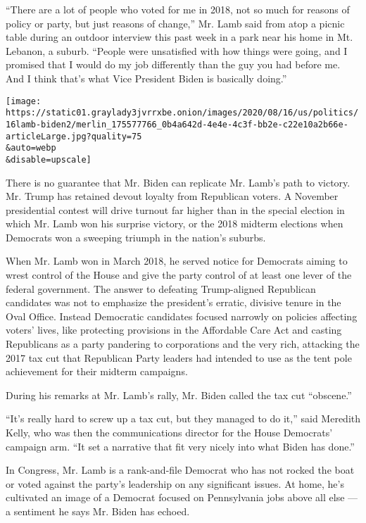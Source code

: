 ``There are a lot of people who voted for me in 2018, not so much for
reasons of policy or party, but just reasons of change,'' Mr. Lamb said
from atop a picnic table during an outdoor interview this past week in a
park near his home in Mt. Lebanon, a suburb. ``People were unsatisfied
with how things were going, and I promised that I would do my job
differently than the guy you had before me. And I think that's what Vice
President Biden is basically doing.''

\texttt{[image: https://static01.graylady3jvrrxbe.onion/images/2020/08/16/us/politics/16lamb-biden2/merlin\_175577766\_0b4a642d-4e4e-4c3f-bb2e-c22e10a2b66e-articleLarge.jpg?quality=75\\\&auto=webp\\\&disable=upscale]}

There is no guarantee that Mr. Biden can replicate Mr. Lamb's path to
victory. Mr. Trump has retained devout loyalty from Republican voters. A
November presidential contest will drive turnout far higher than in the
special election in which Mr. Lamb won his surprise victory, or the 2018
midterm elections when Democrats won a sweeping triumph in the nation's
suburbs.

When Mr. Lamb won in March 2018, he served notice for Democrats aiming
to wrest control of the House and give the party control of at least one
lever of the federal government. The answer to defeating Trump-aligned
Republican candidates was not to emphasize the president's erratic,
divisive tenure in the Oval Office. Instead Democratic candidates
focused narrowly on policies affecting voters' lives, like protecting
provisions in the Affordable Care Act and casting Republicans as a party
pandering to corporations and the very rich, attacking the 2017 tax cut
that Republican Party leaders had intended to use as the tent pole
achievement for their midterm campaigns.

During his remarks at Mr. Lamb's rally, Mr. Biden called the tax cut
``obscene.''

``It's really hard to screw up a tax cut, but they managed to do it,''
said Meredith Kelly, who was then the communications director for the
House Democrats' campaign arm. ``It set a narrative that fit very nicely
into what Biden has done.''

In Congress, Mr. Lamb is a rank-and-file Democrat who has not rocked the
boat or voted against the party's leadership on any significant issues.
At home, he's cultivated an image of a Democrat focused on Pennsylvania
jobs above all else --- a sentiment he says Mr. Biden has echoed.

